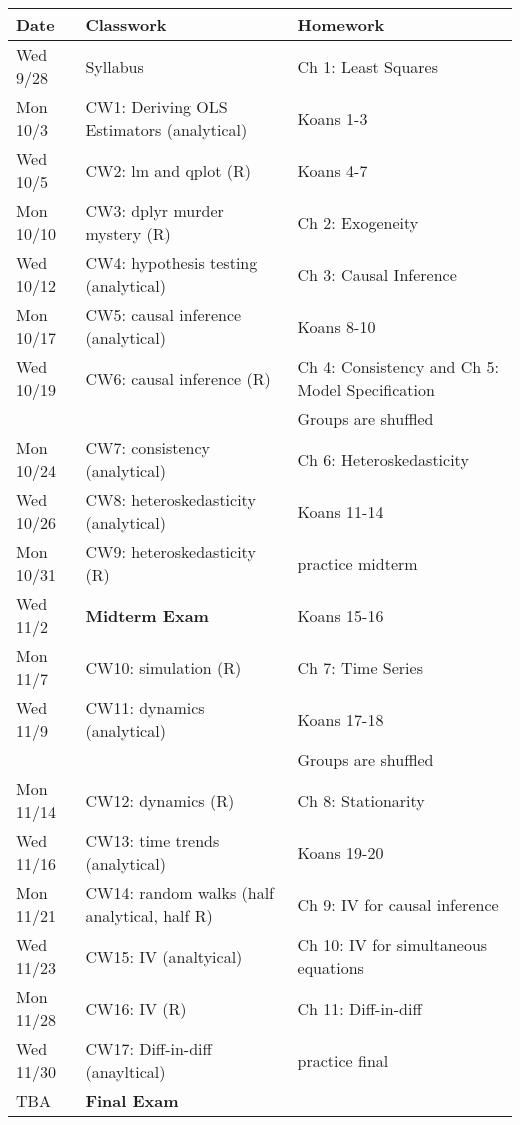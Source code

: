 \documentclass[11pt]{article}
\begin{document}
\begin{center}
\begin{tabular}{lll}
Date & Classwork & Homework\\
\hline
Wed 9/28 & Syllabus & Ch 1: Least Squares\\
Mon 10/3 & CW1: Deriving OLS Estimators (analytical) & Koans 1-3\\
Wed 10/5 & CW2: lm and qplot (R) & Koans 4-7\\
Mon 10/10 & CW3: dplyr murder mystery (R) & Ch 2: Exogeneity\\
Wed 10/12 & CW4: hypothesis testing (analytical) & Ch 3: Causal Inference\\
Mon 10/17 & CW5: causal inference (analytical) & Koans 8-10\\
Wed 10/19 & CW6: causal inference (R) & Ch 4: Consistency and Ch 5: Model Specification\\
 &  & Groups are shuffled\\
Mon 10/24 & CW7: consistency (analytical) & Ch 6: Heteroskedasticity\\
Wed 10/26 & CW8: heteroskedasticity (analytical) & Koans 11-14\\
Mon 10/31 & CW9: heteroskedasticity (R) & practice midterm\\
Wed 11/2 & \textbf{\textbf{Midterm Exam}} & Koans 15-16\\
Mon 11/7 & CW10: simulation (R) & Ch 7: Time Series\\
Wed 11/9 & CW11: dynamics (analytical) & Koans 17-18\\
 &  & Groups are shuffled\\
Mon 11/14 & CW12: dynamics (R) & Ch 8: Stationarity\\
Wed 11/16 & CW13: time trends (analytical) & Koans 19-20\\
Mon 11/21 & CW14: random walks (half analytical, half R) & Ch 9: IV for causal inference\\
Wed 11/23 & CW15: IV (analtyical) & Ch 10: IV for simultaneous equations\\
Mon 11/28 & CW16: IV (R) & Ch 11: Diff-in-diff\\
Wed 11/30 & CW17: Diff-in-diff (anayltical) & practice final\\
TBA & \textbf{\textbf{Final Exam}} & \\
\end{tabular}
\end{center}
\end{document}
